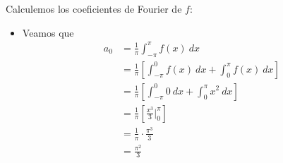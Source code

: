 \documentclass[12pt]{report}
\newcounter{it}
\theoremstyle{largebreak}
\begin{document}
    \begin{sol}
        Calculemos los coeficientes de Fourier de $f$:
        \begin{itemize}
            \item Veamos que
            \begin{equation*}
                \begin{split}
                    a_0&=\frac{1}{\pi}\int_{-\pi}^\pi f(x)\:dx\\
                    &=\frac{1}{\pi}\left[\int_{-\pi}^0 f(x)\:dx+\int_{0}^\pi f(x)\:dx \right]\\
                    &=\frac{1}{\pi}\left[\int_{-\pi}^0 0\:dx+\int_{0}^\pi x^2\:dx\right]\\
                    &=\frac{1}{\pi}\left[\frac{x^3}{3}\Big|_{0}^\pi \right]\\
                    &=\frac{1}{\pi}\cdot\frac{\pi^3}{3}\\
                    &=\frac{\pi^2}{3}\\
                \end{split}
            \end{equation*}


\end{itemize}
\end{sol}
\end{document}
